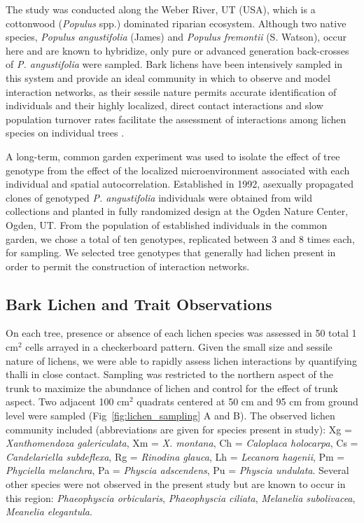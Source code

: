 \documentclass[fleqn,12pt]{olplainarticle}
\begin{document}
The study was conducted along the Weber River, UT (USA), which is a
cottonwood (\textit{Populus} spp.) dominated riparian
ecosystem. Although two native species, \textit{Populus angustifolia}
(James) and \textit{Populus fremontii} (S. Watson), occur here and are
known to hybridize, only pure or advanced generation back-crosses of
\textit{P. angustifolia} were sampled. Bark lichens have been
intensively sampled in this system and provide an ideal community in
which to observe and model interaction networks, as their sessile
nature permits accurate identification of individuals and their highly
localized, direct contact interactions and slow population turnover
rates facilitate the assessment of interactions among lichen species
on individual trees \citep{Lamit2015a}.

A long-term, common garden experiment was used to isolate the effect
of tree genotype from the effect of the localized microenvironment
associated with each individual and spatial
autocorrelation. Established in 1992, asexually propagated clones of
genotyped \textit{P. angustifolia} individuals were obtained from wild
collections and planted in fully randomized design at the Ogden Nature
Center, Ogden, UT. From the population of established individuals in
the common garden, we chose a total of ten genotypes, replicated
between 3 and 8 times each, for sampling. We selected tree genotypes
that generally had lichen present in order to permit the construction
of interaction networks.



\subsection*{Bark Lichen and Trait Observations}


On each tree, presence or absence of each lichen species was assessed
in 50 total 1 cm$^2$ cells arrayed in a checkerboard pattern. Given
the small size and sessile nature of lichens, we were able to rapidly
assess lichen interactions by quantifying thalli in close
contact. Sampling was restricted to the northern aspect of the trunk
to maximize the abundance of lichen and control for the effect of
trunk aspect. Two adjacent 100 cm$^2$ quadrats centered at 50 cm and
95 cm from ground level were sampled (Fig~\ref{fig:lichen_sampling} A
and B). The observed lichen community included (abbreviations are
given for species present in study): Xg = \textit{Xanthomendoza
  galericulata}, Xm = \textit{X. montana}, Ch = \textit{Caloplaca
  holocarpa}, Cs = \textit{Candelariella subdeflexa}, Rg =
\textit{Rinodina glauca}, Lh = \textit{Lecanora hagenii}, Pm =
\textit{Phyciella melanchra}, Pa = \textit{Physcia adscendens}, Pu =
\textit{Physcia undulata}. Several other species were not observed in
the present study but are known to occur in this region:
\textit{Phaeophyscia orbicularis}, \textit{Phaeophyscia ciliata},
\textit{Melanelia subolivacea}, \textit{Meanelia elegantula}.
\end{document}
